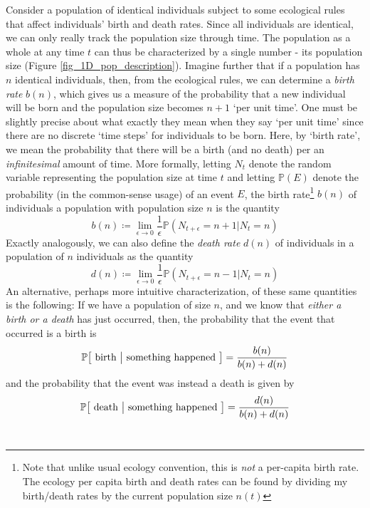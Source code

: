 Consider a population of identical individuals subject to some ecological rules that affect individuals' birth and death rates. Since all individuals are identical, we can only really track the population size through time. The population as a whole at any time $t$ can thus be characterized by a single number - its population size (Figure \ref{fig_1D_pop_description}). Imagine further that if a population has $n$ identical individuals, then, from the ecological rules, we can determine a \emph{birth rate} $b(n)$, which gives us a measure of the probability that a new individual will be born and the population size becomes $n+1$ `per unit time'. One must be slightly precise about what exactly they mean when they say `per unit time' since there are no discrete `time steps' for individuals to be born. Here, by `birth rate', we mean the probability that there will be a birth (and no death) per an \emph{infinitesimal} amount of time. More formally, letting $N_t$ denote the random variable representing the population size at time $t$ and letting $\mathbb{P}(E)$ denote the probability (in the common-sense usage) of an event $E$, the birth rate\footnote{Note that unlike usual ecology convention, this is \emph{not} a per-capita birth rate. The ecology per capita birth and death rates can be found by dividing my birth/death rates by the current population size $n(t)$} $b(n)$ of individuals a population with population size $n$ is the quantity
\begin{equation}
\label{1D_birthrate_defn}
b(n) \coloneqq \lim_{\epsilon \to 0}\frac{1}{\epsilon}\mathbb{P}\left(N_{t+\epsilon}=n+1 | N_{t}=n\right)
\end{equation}
Exactly analogously, we can also define the \emph{death rate} $d(n)$ of individuals in a population of $n$ individuals as the quantity
\begin{equation}
\label{1D_deathrate_defn}
d(n) \coloneqq \lim_{\epsilon \to 0}\frac{1}{\epsilon}\mathbb{P}\left(N_{t+\epsilon}=n-1 | N_{t}=n\right)
\end{equation}
An alternative, perhaps more intuitive characterization, of these same quantities is the following: If we have a population of size $n$, and we know that \emph{either a birth or a death} has just occurred, then, the probability that the event that occurred is a birth is
\begin{equation*}
\mathbb{P\big[\textrm{ birth } \big{|} \textrm{ something happened }\big]} = \frac{b(n)}{b(n)+d(n)}
\end{equation*}
and the probability that the event was instead a death is given by
\begin{equation*}
\mathbb{P\big[\textrm{ death } \big{|} \textrm{ something happened }\big]} = \frac{d(n)}{b(n)+d(n)}
\end{equation*}
\\

